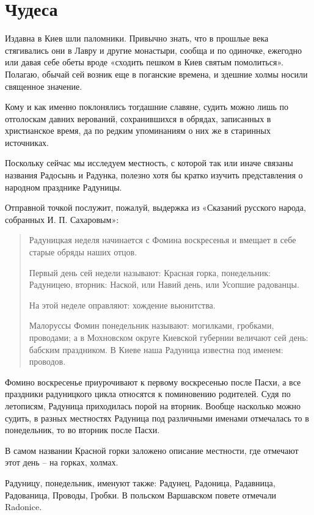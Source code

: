 \chapter{Чудеса}

Издавна в Киев шли паломники. Привычно знать, что в прошлые века стягивались они в Лавру и другие монастыри, сообща и по одиночке, ежегодно или давая себе обеты вроде «сходить пешком в Киев святым помолиться». Полагаю, обычай сей возник еще в поганские времена, и здешние холмы носили священное значение.

Кому и как именно поклонялись тогдашние славяне, судить можно лишь по отголоскам давних верований, сохранившихся в обрядах, записанных в христианское время, да по редким упоминаниям о них же в старинных источниках.

Поскольку сейчас мы исследуем местность, с которой так или иначе связаны названия Радосынь и Радунка, полезно хотя бы кратко изучить представления о народном празднике Радуницы.

Отправной точкой послужит, пожалуй, выдержка из «Сказаний русского народа, собранных И. П. Сахаровым»:

\begin{quotation}
Радуницкая неделя начинается с Фомина воскресенья и вмещает в себе старые обряды наших отцов.

Первый день сей недели называют: Красная горка, понедельник: Радуницею, вторник: Наской, или Навий день, или Усопшие радованцы. 

На этой неделе оправляют: хождение вьюнитства.

Малоруссы Фомин понедельник называют: могилками, гробками, проводами; а в Мохновском округе Киевской губернии величают сей день: бабским праздником. В Киеве наша Радуница известна под именем: проводов.
\end{quotation}

Фомино воскресенье приурочивают к первому воскресенью после Пасхи, а все праздники радуницкого цикла относятся к поминовению родителей. Судя по летописям, Радуница приходилась порой на вторник. Вообще насколько можно судить, в разных местностях Радуница под различными именами отмечалась то в понедельник, то во вторник после Пасхи.

В самом названии Красной горки заложено описание местности, где отмечают этот день – на горках, холмах.

Радуницу, понедельник, именуют также: Радунец, Радоница, Радавница, Радованица, Проводы, Гробки. В польском Варшавском повете отмечали Radonice.

